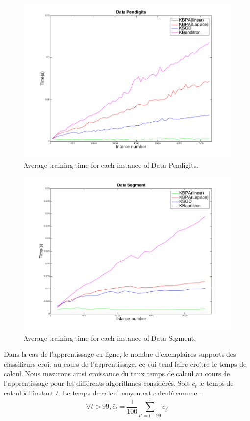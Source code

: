 \documentclass[twocolumn]{article}
\begin{document}
\begin{figure}[t!]
	\includegraphics[width=\linewidth]{figs/Pendigits_kernel_T.png}
	\caption{Average training time for each instance of Data Pendigits.}
	\label{pic:PKT}
\end{figure}

\begin{figure}[t!]
	\centerline{
		\includegraphics[width=\linewidth]{figs/Segment_kernel_T.png}}
	\caption{Average training time for each instance of Data Segment.}
	\label{pic:SKT}
\end{figure}

Dans la cas de l'apprentissage en ligne, le nombre d'exemplaires supports des classifieurs croît au cours de l'apprentissage, ce qui tend faire croître le temps de calcul. Nous mesurons ainsi croissance du taux temps de calcul au cours de l'apprentissage pour les différents algorithmes considérés. Soit $c_t$ le temps de calcul à l'instant $t$.  Le temps de calcul moyen est calculé comme~: 
$$\forall t>99, \bar{c}_t = \frac{1}{100} \sum_{t'=t - 99}^t c_{t^\prime}$$
\end{document}
